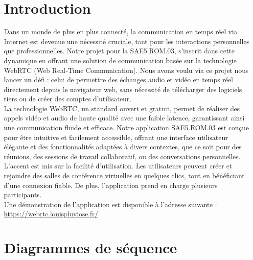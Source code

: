 \documentclass[12pt, a4paper, oneside]{thesis}
\begin{document}
\lstlistoflistings

\listoffigures

\newpage

\section{Introduction}

Dans un monde de plus en plus connecté, la communication en temps réel via Internet est devenue une nécessité cruciale, tant pour les interactions personnelles que professionnelles. Notre projet pour la SAE5.ROM.03, s'inscrit dans cette dynamique en offrant une solution de communication basée sur la technologie WebRTC (Web Real-Time Communication). Nous avons voulu via ce projet nous lancer un défi : celui de permettre des échanges audio et vidéo en temps réel directement depuis le navigateur web, sans nécessité de télécharger des logiciels tiers ou de créer des comptes d'utilisateur.\\

La technologie WebRTC, un standard ouvert et gratuit, permet de réaliser des appels vidéo et audio de haute qualité avec une faible latence, garantissant ainsi une communication fluide et efficace. Notre application SAE5.ROM.03 est conçue pour être intuitive et facilement accessible, offrant une interface utilisateur élégante et des fonctionnalités adaptées à divers contextes, que ce soit pour des réunions, des sessions de travail collaboratif, ou des conversations personnelles.\\

L'accent est mis sur la facilité d'utilisation. Les utilisateurs peuvent créer et rejoindre des salles de conférence virtuelles en quelques clics, tout en bénéficiant d'une connexion fiable. De plus, l'application prend en charge plusieurs participants.\\

Une démonstration de l'application est disponible à l'adresse suivante : \url{https://webrtc.louispluviose.fr/}
\newpage

\section{Diagrammes de séquence}
\end{document}
